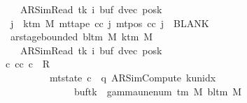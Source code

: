 \begin{isabellebody}
\ \ \ \ \ \ \ \ \ \ \ \ \ \ \ \ \ \ \ \ {\isacharparenleft}{\kern0pt}AR{\isacharunderscore}{\kern0pt}SimRead{\isacharcomma}{\kern0pt}\ tk{\isacharcomma}{\kern0pt}\ i{\isacharcomma}{\kern0pt}\ buf{\isacharprime}{\kern0pt}{\isacharcomma}{\kern0pt}\ dvec{\isacharcomma}{\kern0pt}\ posk{\isacharprime}{\kern0pt}{\isacharparenright}{\kern0pt}{\isacharsemicolon}{\kern0pt}\isanewline
\ \ \ \ \ \ \ \ \ \ \ \ \ \ \ \ \ \ {\isasymforall}j\ {\isasymge}\ k{\isacharunderscore}{\kern0pt}tm\ M{\isachardot}{\kern0pt}\ mt{\isacharunderscore}{\kern0pt}tape\ cc\ j\ {\isacharparenleft}{\kern0pt}mt{\isacharunderscore}{\kern0pt}pos\ cc\ j{\isacharparenright}{\kern0pt}\ {\isacharequal}{\kern0pt}\ BLANK{}{\isacharsemicolon}{\kern0pt}\isanewline
\ \ \ \ \ \ \ \ \ \ \ \ \ \ \ \ \ \ ar{\isacharunderscore}{\kern0pt}stage{\isacharunderscore}{\kern0pt}bounded\ {\isacharparenleft}{\kern0pt}bl{\isacharunderscore}{\kern0pt}tm\ M{\isacharparenright}{\kern0pt}\ {\isacharparenleft}{\kern0pt}k{\isacharunderscore}{\kern0pt}tm\ M{\isacharparenright}{\kern0pt}\isanewline
\ \ \ \ \ \ \ \ \ \ \ \ \ \ \ \ \ \ \ \ {\isacharparenleft}{\kern0pt}AR{\isacharunderscore}{\kern0pt}SimRead{\isacharcomma}{\kern0pt}\ tk{\isacharcomma}{\kern0pt}\ i{\isacharcomma}{\kern0pt}\ buf{\isacharprime}{\kern0pt}{\isacharcomma}{\kern0pt}\ dvec{\isacharcomma}{\kern0pt}\ posk{\isacharprime}{\kern0pt}{\isacharparenright}{\kern0pt}\ {\isasymrbrakk}\isanewline
\ \ \ \ \ \ \ \ \ \ \ \ \ \ \ \ {\isasymLongrightarrow}\ {\isasymexists}c{\isacharprime}{\kern0pt}{\isacharprime}{\kern0pt}{\isachardot}{\kern0pt}\ {\isacharparenleft}{\kern0pt}cc{\isacharcomma}{\kern0pt}\ c{\isacharprime}{\kern0pt}{\isacharprime}{\kern0pt}{\isacharparenright}{\kern0pt}\ {\isasymin}\ R{\isacharprime}{\kern0pt}\isanewline
\ \ \ \ \ \ \ \ \ \ \ \ \ \ \ \ \ \ \ \ \ \ \ \ \ {\isasymand}\ mt{\isacharunderscore}{\kern0pt}state\ c{\isacharprime}{\kern0pt}{\isacharprime}{\kern0pt}\ {\isacharequal}{\kern0pt}\ {\isacharparenleft}{\kern0pt}q{\isacharcomma}{\kern0pt}\ AR{\isacharunderscore}{\kern0pt}SimCompute{\isacharcomma}{\kern0pt}\ k{\isacharunderscore}{\kern0pt}unidx\ {}{\isacharcomma}{\kern0pt}\ {}{\isacharcomma}{\kern0pt}\isanewline
\ \ \ \ \ \ \ \ \ \ \ \ \ \ \ \ \ \ \ \ \ \ \ \ \ \ \ \ \ \ \ buf{\isacharprime}{\kern0pt}{\isacharparenleft}{\kern0pt}tk\ {\isacharcolon}{\kern0pt}{\isacharequal}{\kern0pt}\ gamma{\isacharunderscore}{\kern0pt}unenum\ {\isacharparenleft}{\kern0pt}{\isasymGamma}{\isacharunderscore}{\kern0pt}tm\ M{\isacharparenright}{\kern0pt}\ {\isacharparenleft}{\kern0pt}bl{\isacharunderscore}{\kern0pt}tm\ M{\isacharparenright}{\kern0pt}\isanewline

\end{isabellebody}
